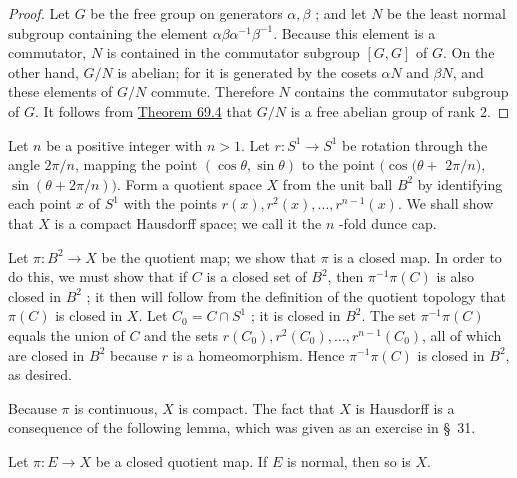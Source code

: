 \begin{proof}
Let \(G\) be the free group on generators \(\alpha ,\beta\) ; and let \(N\) be the least normal subgroup containing the element \({\alpha \beta }{\alpha }^{-1}{\beta }^{-1}\). Because this element is a commutator, \(N\) is contained in the commutator subgroup \([ {G,G}]\) of \(G\). On the other hand, \(G/N\) is abelian; for it is generated by the cosets \({\alpha N}\) and \({\beta N}\), and these elements of \(G/N\) commute. Therefore \(N\) contains the commutator subgroup of \(G\).
It follows from \hyperref[thm:69.4]{Theorem 69.4} that \(G/N\) is a free abelian group of rank 2.
\end{proof}
\begin{definition}
Let \(n\) be a positive integer with \(n > 1\). Let \(r : S^{1} \rightarrow {S}^{1}\) be rotation through the angle \({2\pi }/n\), mapping the point \(( {\cos \theta ,\sin \theta })\) to the point \((\cos (\theta +\) \({2\pi }/n)\), \(\sin ( {\theta + {2\pi }/n}) )\). Form a quotient space \(X\) from the unit ball \(B^{2}\) by identifying each point \(x\) of \(S^{1}\) with the points \(r(x),r^{2}(x),\ldots ,r^{n - 1}(x)\). We shall show that \(X\) is a compact Hausdorff space; we call it the \(n\) -fold dunce cap.
\end{definition}

Let \(\pi : B^{2} \rightarrow X\) be the quotient map; we show that \(\pi\) is a closed map. In order to do this, we must show that if \(C\) is a closed set of \(B^{2}\), then \({\pi }^{-1}\pi ( C)\) is also closed in \(B^{2}\) ; it then will follow from the definition of the quotient topology that \(\pi ( C)\) is closed in \(X\). Let \(C_{0} = C \cap {S}^{1}\) ; it is closed in \(B^{2}\). The set \({\pi }^{-1}\pi ( C)\) equals the union of \(C\) and the sets \(r( C_{0}),r^{2}( C_{0}),\ldots ,r^{n - 1}( C_{0})\), all of which are closed in \(B^{2}\) because \(r\) is a homeomorphism. Hence \({\pi }^{-1}\pi ( C)\) is closed in \(B^{2}\), as desired.

Because \(\pi\) is continuous, \(X\) is compact. The fact that \(X\) is Hausdorff is a consequence of the following lemma, which was given as an exercise in \S\ 31.

\begin{lemma}
\label{lem:\thetheorem}
Let \(\pi : E \rightarrow X\) be a closed quotient map. If \(E\) is normal, then so is \(X\).
\end{lemma}

